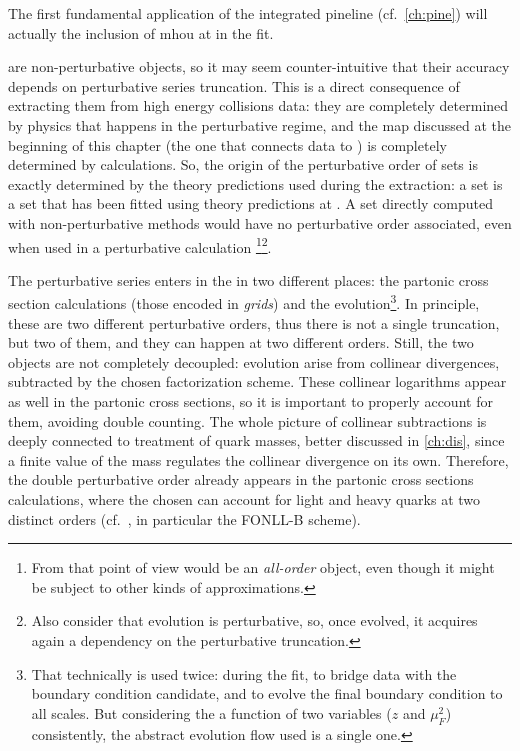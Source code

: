 
The first fundamental application of the integrated pineline (cf.\
\cref{ch:pine}) will actually the inclusion of \acrfull{mhou} at \nnlo in the
\nnpdfr{4.0} fit.

\pdfs are non-perturbative objects, so it may seem counter-intuitive that their
accuracy depends on perturbative series truncation.
%
This is a direct consequence of extracting them from high energy collisions
data: they are completely determined by physics that happens in the
perturbative regime, and the map discussed at the beginning of this chapter
(the one that connects data to \pdfs) is completely determined by \pqft
calculations.
%
So, the origin of the perturbative order of \pdf sets is exactly determined by
the theory predictions used during the extraction: a \nnlo set is a \pdf set
that has been fitted using theory predictions at \nnlo.
%
A \pdf set directly computed with non-perturbative methods would have no
perturbative order associated, even when used in a perturbative calculation
\footnote{
	From that point of view would be an \textit{all-order} object, even though
	it might be subject to other kinds of approximations.
}\footnote{
	Also consider that \dglap evolution is perturbative, so, once evolved, it
	acquires again a dependency on the perturbative truncation.
}.

The perturbative series enters in the \pdf in two different places: the
partonic cross section calculations (those encoded in \textit{grids}) and the
\dglap evolution\footnote{
	That technically is used twice: during the fit, to bridge data with the
	boundary condition candidate, and to evolve the final boundary condition to
	all scales.
	But considering the \pdf a function of two variables ($z$ and $\mu_F^2$)
	consistently, the abstract evolution flow used is a single one.
}.
%
In principle, these are two different perturbative orders, thus there is not a
single truncation, but two of them, and they can happen at two different
orders.
%
Still, the two objects are not completely decoupled: \dglap evolution arise
from collinear divergences, subtracted by the chosen factorization scheme.
These collinear logarithms appear as well in the partonic cross sections, so it
is important to properly account for them, avoiding double counting.
%
The whole picture of collinear subtractions is deeply connected to treatment of
quark masses, better discussed in \cref{ch:dis}, since a finite value of the
mass regulates the collinear divergence on its own.
%
Therefore, the double perturbative order already appears in the partonic cross
sections calculations, where the \fns chosen can account for light and heavy
quarks at two distinct orders (cf.\ \cite{Forte:2010ta}, in particular the
FONLL-B scheme).
